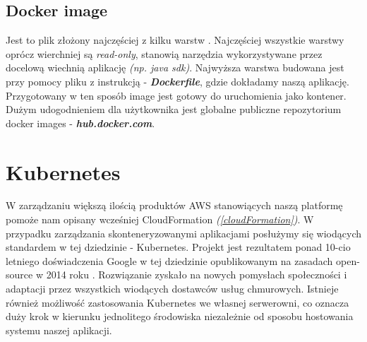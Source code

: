 \subsection{Docker image}
Jest to plik złożony najczęściej z kilku warstw \cite{docker-doc}. 
Najczęściej wszystkie warstwy oprócz wierchniej są \emph{read-only}, stanowią narzędzia wykorzystywane przez docelową wiechnią aplikację \emph{(np. java sdk)}.
Najwyższa warstwa budowana jest przy pomocy pliku z instrukcją - \emph{\textbf{Dockerfile}}, gdzie dokładamy naszą aplikację.
Przygotowany w ten sposób image jest gotowy do uruchomienia jako kontener. Dużym udogodnieniem dla użytkownika jest globalne publiczne repozytorium docker images - \emph{\textbf{hub.docker.com}}.


\section{Kubernetes}
W zarządzaniu większą ilością produktów AWS stanowiących naszą platformę pomoże nam opisany wcześniej CloudFormation \emph{(\ref{cloudFormation})}. 
W przypadku zarządzania skonteneryzowanymi aplikacjami posłużymy się wiodących standardem w tej dziedzinie - Kubernetes.
Projekt jest rezultatem ponad 10-cio letniego doświadczenia Google w tej dziedzinie opublikowanym na zasadach open-source w 2014 roku \cite{k8s-what}.
Rozwiązanie zyskało na nowych pomysłach społeczności i adaptacji przez wszystkich wiodących dostawców usług chmurowych.
Istnieje również możliwość zastosowania Kubernetes we własnej serwerowni, 
co oznacza duży krok w kierunku jednolitego środowiska niezależnie od sposobu hostowania systemu naszej aplikacji.